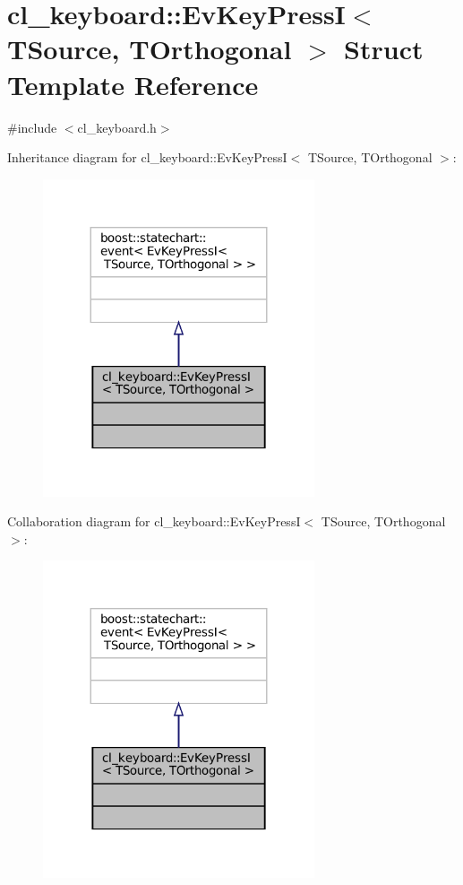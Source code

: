 \hypertarget{structcl__keyboard_1_1EvKeyPressI}{}\section{cl\+\_\+keyboard\+:\+:Ev\+Key\+PressI$<$ T\+Source, T\+Orthogonal $>$ Struct Template Reference}
\label{structcl__keyboard_1_1EvKeyPressI}


{\ttfamily \#include $<$cl\+\_\+keyboard.\+h$>$}



Inheritance diagram for cl\+\_\+keyboard\+:\+:Ev\+Key\+PressI$<$ T\+Source, T\+Orthogonal $>$\+:
\nopagebreak
\begin{figure}[H]
\begin{center}
\leavevmode
\includegraphics[width=227pt]{structcl__keyboard_1_1EvKeyPressI__inherit__graph}
\end{center}
\end{figure}


Collaboration diagram for cl\+\_\+keyboard\+:\+:Ev\+Key\+PressI$<$ T\+Source, T\+Orthogonal $>$\+:
\nopagebreak
\begin{figure}[H]
\begin{center}
\leavevmode
\includegraphics[width=227pt]{structcl__keyboard_1_1EvKeyPressI__coll__graph}
\end{center}
\end{figure}


